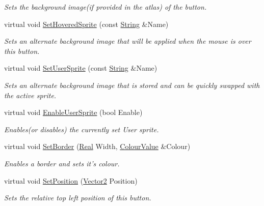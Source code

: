 \begin{DoxyCompactItemize}
\begin{DoxyCompactList}\small\item\em Sets the background image(if provided in the atlas) of the button. \item\end{DoxyCompactList}\item 
virtual void \hyperlink{classphys_1_1UI_1_1Button_a12cfac0dcc6324694f29968c0ca25d03}{SetHoveredSprite} (const \hyperlink{namespacephys_aa03900411993de7fbfec4789bc1d392e}{String} \&Name)
\begin{DoxyCompactList}\small\item\em Sets an alternate background image that will be applied when the mouse is over this button. \item\end{DoxyCompactList}\item 
virtual void \hyperlink{classphys_1_1UI_1_1Button_a8c3a5657daf79a882f71691e91785d4d}{SetUserSprite} (const \hyperlink{namespacephys_aa03900411993de7fbfec4789bc1d392e}{String} \&Name)
\begin{DoxyCompactList}\small\item\em Sets an alternate background image that is stored and can be quickly swapped with the active sprite. \item\end{DoxyCompactList}\item 
virtual void \hyperlink{classphys_1_1UI_1_1Button_a4fe6560484f1d78b08c96eaf967404d2}{EnableUserSprite} (bool Enable)
\begin{DoxyCompactList}\small\item\em Enables(or disables) the currently set User sprite. \item\end{DoxyCompactList}\item 
virtual void \hyperlink{classphys_1_1UI_1_1Button_a94a4296fd5b2153f10e77aca08481d15}{SetBorder} (\hyperlink{namespacephys_af7eb897198d265b8e868f45240230d5f}{Real} Width, \hyperlink{classphys_1_1ColourValue}{ColourValue} \&Colour)
\begin{DoxyCompactList}\small\item\em Enables a border and sets it's colour. \item\end{DoxyCompactList}\item 
virtual void \hyperlink{classphys_1_1UI_1_1Button_aadb9b867ceccad8313591ae5e434274d}{SetPosition} (\hyperlink{classphys_1_1Vector2}{Vector2} Position)
\begin{DoxyCompactList}\small\item\em Sets the relative top left position of this button. \item\end{DoxyCompactList}\item 

\end{DoxyCompactItemize}
